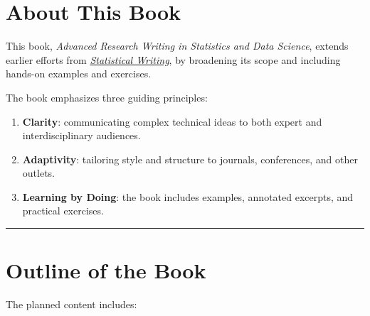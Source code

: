 \documentclass[
]{book}
\theoremstyle{definition}
\theoremstyle{definition}
\theoremstyle{definition}
\theoremstyle{definition}
\theoremstyle{remark}
\begin{document}
\section{About This Book}\label{about-this-book}

This book, \emph{Advanced Research Writing in Statistics and Data Science}, extends earlier efforts from \href{https://statds.github.io/stat-writing/}{\emph{Statistical Writing}}, by broadening its scope and including hands-on examples and exercises.

The book emphasizes three guiding principles:

\begin{enumerate}
\def\labelenumi{\arabic{enumi}.}
\item
  \textbf{Clarity}: communicating complex technical ideas to both expert and interdisciplinary audiences.
\item
  \textbf{Adaptivity}: tailoring style and structure to journals, conferences, and other outlets.\\
\item
  \textbf{Learning by Doing}: the book includes examples, annotated excerpts, and practical exercises.
\end{enumerate}

\begin{center}\rule{0.5\linewidth}{0.5pt}\end{center}

\section{Outline of the Book}\label{outline-of-the-book}

The planned content includes:
\end{document}
